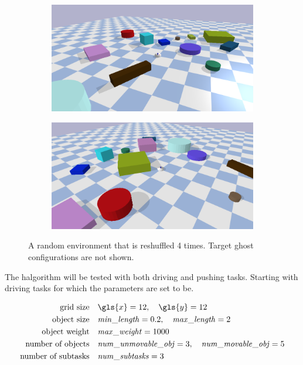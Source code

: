 \begin{figure}[H]
    \vspace{0.2cm}
    \begin{subfigure}{.49\textwidth}
    \includegraphics[width=\textwidth]{figures/tests/random3}
    \end{subfigure}
    \hfill
    \begin{subfigure}{.49\textwidth}
    \centering
    \includegraphics[width=\textwidth]{figures/tests/random4}
    \end{subfigure}
    \caption{A random environment that is reshuffled 4 times. Target ghost configurations are not shown.}
    \label{fig:random_environment_reshuffle}
\end{figure}

The \ac{halgorithm} will be tested with both driving and pushing tasks. Starting with driving tasks for which the parameters are set to be.\bs

\begin{center}
\begin{align*}
\text{grid size} \quad &\gls{x}=12, \quad \gls{y}=12 \\
\text{object size} \quad &\mathit{min\_length}=0.2, \quad \mathit{max\_length}=2 \\
\text{object weight} \quad &\mathit{max\_weight}=1000 \\
\text{number of objects} \quad &\mathit{num\_unmovable\_obj}=3, \quad \mathit{num\_movable\_obj}=5 \\
\text{number of subtasks} \quad &\mathit{num\_subtasks}=3
\end{align*}
\end{center}


